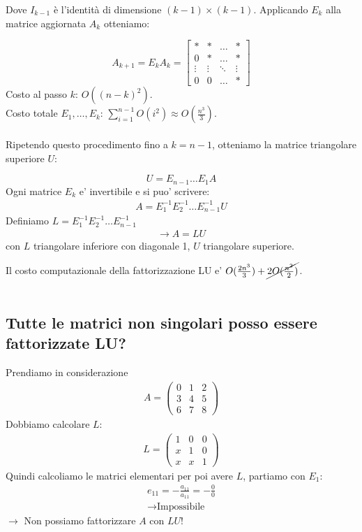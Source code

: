 \documentclass[a4paper,12pt]{article}
\begin{document}
\begin{itemize}
Dove \(I_{k-1}\) è l'identità di dimensione \((k-1)\times(k-1)\).  
Applicando \(E_k\) alla matrice aggiornata \(A_k\) otteniamo:

\[
A_{k+1} = E_k A_k =
\begin{bmatrix}
* & * & \dots & * \\
0 & * & \dots & * \\
\vdots & \vdots & \ddots & \vdots \\
0 & 0 & \dots & *
\end{bmatrix}
\]
Costo al passo $k$: $O((n-k)^2)$. \\
Costo totale $E_1,\dots,E_k$: $\sum_{i=1}^{n-1} O(i^2) \approx O(\frac{n^3}{3})$. \\
\vspace{1em}\\
Ripetendo questo procedimento fino a \(k = n-1\), otteniamo la matrice triangolare superiore \(U\):

\[
U = E_{n-1} \dots E_1 A
\]
Ogni matrice $E_k$ e' invertibile e si puo' scrivere:
\begin{align*}
    A=E_1^{-1}E_2^{-1}\dots E_{n-1}^{-1} U 
\end{align*}
Definiamo $L = E_1^{-1}E_2^{-1}\dots E_{n-1}^{-1}$
\begin{align*}
    \rightarrow A = LU
\end{align*}
con $L$ triangolare inferiore con diagonale 1, $U$ triangolare superiore.
\end{itemize}
Il costo computazionale della fattorizzazione LU e' $O(\frac{2n^3}{3}) + \cancel{2O(\frac{n^2}{2})}$. \\
\vspace{2em}\\
\subsection*{Tutte le matrici non singolari posso essere fattorizzate LU?}
Prendiamo in considerazione
\begin{align*}
    A =\begin{pmatrix}
        0 & 1 & 2 \\
        3 & 4 & 5 \\
        6 & 7 & 8
    \end{pmatrix}
\end{align*}
Dobbiamo calcolare $L$:
\begin{align*}
    L = \begin{pmatrix}
        1 & 0 & 0 \\
        x & 1 & 0 \\
        x & x & 1
    \end{pmatrix}
\end{align*}
Quindi calcoliamo le matrici elementari per poi avere $L$, partiamo con $E_1$:
\begin{align*}
    e_{11} = -\frac{a_{11}}{a_{11}} = - \frac{0}{0} \\
    \to \text{Impossibile}
\end{align*}
$\rightarrow$ Non possiamo fattorizzare $A$ con $LU$! 
\vspace{1em}
\end{document}
